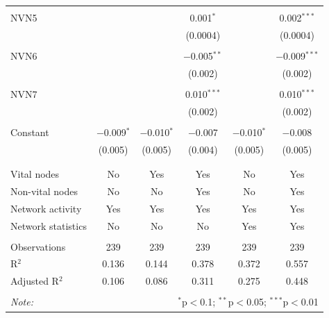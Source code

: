 \begin{table}[!htbp]
\begin{tabular}{@{\extracolsep{5pt}}lccccc}
  & & & & & \\ 
 NVN5 &  &  & 0.001$^{*}$ &  & 0.002$^{***}$ \\ 
  &  &  & (0.0004) &  & (0.0004) \\ 
  & & & & & \\ 
 NVN6 &  &  & $-$0.005$^{**}$ &  & $-$0.009$^{***}$ \\ 
  &  &  & (0.002) &  & (0.002) \\ 
  & & & & & \\ 
 NVN7 &  &  & 0.010$^{***}$ &  & 0.010$^{***}$ \\ 
  &  &  & (0.002) &  & (0.002) \\ 
  & & & & & \\ 
 Constant & $-$0.009$^{*}$ & $-$0.010$^{*}$ & $-$0.007 & $-$0.010$^{*}$ & $-$0.008 \\ 
  & (0.005) & (0.005) & (0.004) & (0.005) & (0.005) \\ 
  & & & & & \\ 
\hline \\[-1.8ex] 
Vital nodes & No & Yes & Yes & No & Yes \\ 
Non-vital nodes & No & No & Yes & No & Yes \\ 
Network activity & Yes & Yes & Yes & Yes & Yes \\ 
Network statistics & No & No & No & Yes & Yes \\ 
\hline &  &  &  &  &  \\ 
Observations & 239 & 239 & 239 & 239 & 239 \\ 
R$^{2}$ & 0.136 & 0.144 & 0.378 & 0.372 & 0.557 \\ 
Adjusted R$^{2}$ & 0.106 & 0.086 & 0.311 & 0.275 & 0.448 \\ 
\hline 
\hline \\[-1.8ex] 
\textit{Note:}  & \multicolumn{5}{r}{$^{*}$p$<$0.1; $^{**}$p$<$0.05; $^{***}$p$<$0.01} \\ 
\end{tabular} 
\end{table} 
